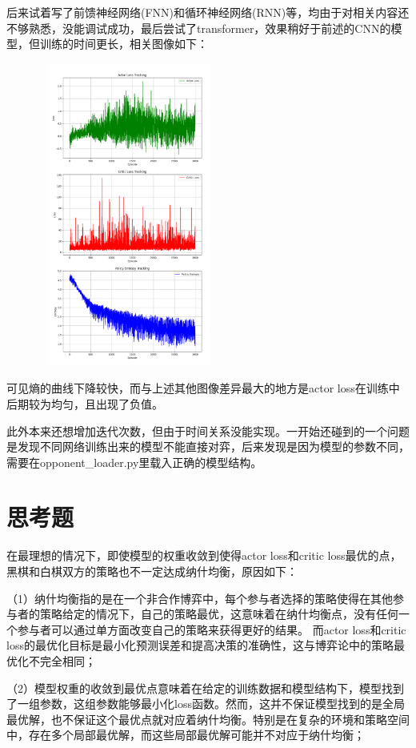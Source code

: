 \documentclass{ctexart}
\begin{document}
后来试着写了前馈神经网络(FNN)和循环神经网络(RNN)等，均由于对相关内容还不够熟悉，没能调试成功，最后尝试了transformer，效果稍好于前述的CNN的模型，但训练的时间更长，相关图像如下：
	\begin{figure}[H]
		\centering 
		\includegraphics[height=10cm,width=6cm]{4.png}
		\end{figure}
可见熵的曲线下降较快，而与上述其他图像差异最大的地方是actor loss在训练中后期较为均匀，且出现了负值。

	此外本来还想增加迭代次数，但由于时间关系没能实现。一开始还碰到的一个问题是发现不同网络训练出来的模型不能直接对弈，后来发现是因为模型的参数不同，需要在opponent\_loader.py里载入正确的模型结构。
	\section{思考题}
	在最理想的情况下，即使模型的权重收敛到使得actor loss和critic loss最优的点，黑棋和白棋双方的策略也不一定达成纳什均衡，原因如下：

（1）纳什均衡指的是在一个非合作博弈中，每个参与者选择的策略使得在其他参与者的策略给定的情况下，自己的策略最优，这意味着在纳什均衡点，没有任何一个参与者可以通过单方面改变自己的策略来获得更好的结果。
而actor loss和critic loss的最优化目标是最小化预测误差和提高决策的准确性，这与博弈论中的策略最优化不完全相同；

（2）模型权重的收敛到最优点意味着在给定的训练数据和模型结构下，模型找到了一组参数，这组参数能够最小化loss函数。然而，这并不保证模型找到的是全局最优解，也不保证这个最优点就对应着纳什均衡。特别是在复杂的环境和策略空间中，存在多个局部最优解，而这些局部最优解可能并不对应于纳什均衡；
\end{document}
